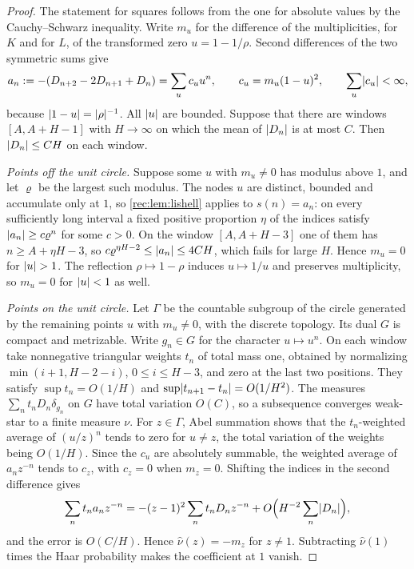 \begin{proof}
The statement for squares follows from the one for absolute values by the Cauchy--Schwarz
inequality. Write $m_u$ for the difference of the multiplicities, for $K$ and for $L$, of the
transformed zero $u=1-1/\rho$. Second differences of the two symmetric sums give
\[
 a_n:=-(D_{n+2}-2D_{n+1}+D_n)=\sum_uc_uu^n,\qquad c_u=m_u(1-u)^2,\qquad\sum_u\lvert c_u\rvert<\infty,
\]
because $\lvert1-u\rvert=\lvert\rho\rvert^{-1}$. All $\lvert u\rvert$ are bounded. Suppose that there are windows
$[A,A+H-1]$ with $H\to\infty$ on which the mean of $\lvert D_n\rvert$ is at most $C$. Then
$\lvert D_n\rvert\le CH$ on each window.

\emph{Points off the unit circle.} Suppose some $u$ with $m_u\ne0$ has modulus above $1$, and
let $\varrho$ be the largest such modulus. The nodes $u$ are distinct, bounded and accumulate
only at $1$, so \cref{rec:lem:lishell} applies to $s(n)=a_n$: on every sufficiently long
interval a fixed positive proportion $\eta$ of the indices satisfy $\lvert a_n\rvert\ge c\varrho^n$ for
some $c>0$. On the window $[A,A+H-3]$ one of them has $n\ge A+\eta H-3$, so
$c\varrho^{\eta H-2}\le\lvert a_n\rvert\le4CH$, which fails for large $H$. Hence $m_u=0$ for $\lvert u\rvert>1$. The reflection $\rho\mapsto1-\rho$ induces $u\mapsto1/u$ and preserves
multiplicity, so $m_u=0$ for $\lvert u\rvert<1$ as well.

\emph{Points on the unit circle.} Let $\Gamma$ be the countable subgroup of the circle generated
by the remaining points $u$ with $m_u\ne0$, with the discrete topology. Its dual $G$ is compact
and metrizable. Write $g_n\in G$ for the character $u\mapsto u^n$. On each window take
nonnegative triangular weights $t_n$ of total mass one, obtained by normalizing
$\min(i+1,H-2-i)$, $0\le i\le H-3$, and zero at the last two positions. They satisfy
$\sup t_n=O(1/H)$ and $\sup\lvert t_{n+1}-t_n\rvert=O(1/H^2)$. The measures $\sum_nt_nD_n\delta_{g_n}$
on $G$ have total variation $O(C)$, so a subsequence converges weak-star to a finite measure
$\nu$. For $z\in\Gamma$, Abel summation shows that the $t_n$-weighted average of $(u/z)^n$ tends
to zero for $u\ne z$, the total variation of the weights being $O(1/H)$. Since the $c_u$ are
absolutely summable, the weighted average of $a_nz^{-n}$ tends to $c_z$, with $c_z=0$ when
$m_z=0$. Shifting the indices in the second difference gives
\[
 \sum_nt_na_nz^{-n}=-(z-1)^2\sum_nt_nD_nz^{-n}+O\Bigl(H^{-2}\sum_n\lvert D_n\rvert\Bigr),
\]
and the error is $O(C/H)$. Hence $\hat\nu(z)=-m_z$ for $z\ne1$. Subtracting $\hat\nu(1)$ times
the Haar probability makes the coefficient at $1$ vanish.


\end{proof}
